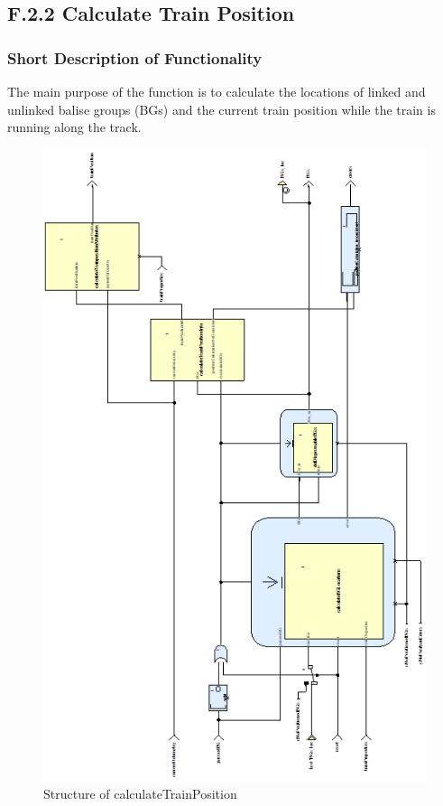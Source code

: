 \subsection{F.2.2 Calculate Train Position}\label{sss:calctrainpos}

\subsubsection{Short Description of Functionality}
The main purpose of the function is to calculate the locations of linked and unlinked balise groups (BGs) and the current train position while the train is running along the track. 

\begin{figure}[hbtp]
\centering
\includegraphics[scale=0.8]{../images/CalculateTrainPosition.png}
\caption{Structure of calculateTrainPosition}
\end{figure}


